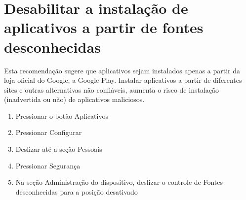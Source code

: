 \section{Desabilitar a instala\c c\~ao de aplicativos a partir de fontes desconhecidas}

Esta recomenda\c c\~ao sugere que aplicativos sejam instalados apenas a partir da loja oficial do Google, a Google Play. Instalar aplicativos a partir de diferentes sites e outras alternativas n\~ao confi\'aveis, aumenta o risco de instala\c c\~ao (inadvertida ou n\~ao) de aplicativos maliciosos.

\begin{enumerate}
\item Pressionar o bot\~ao Aplicativos
\item Pressionar Configurar
\item Deslizar at\'e a se\c c\~ao Pessoais
\item Pressionar Seguran\c ca
\item Na se\c c\~ao Administra\c c\~ao do dispositivo, deslizar o controle de Fontes desconhecidas para a posi\c c\~ao desativado
\end{enumerate}
